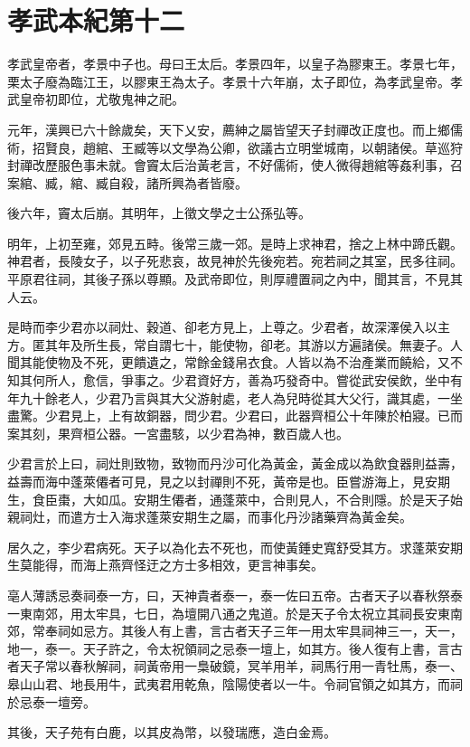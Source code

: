 \chapter{孝武本紀第十二}

孝武皇帝者，孝景中子也。母曰王太后。孝景四年，以皇子為膠東王。孝景七年，栗太子廢為臨江王，以膠東王為太子。孝景十六年崩，太子即位，為孝武皇帝。孝武皇帝初即位，尤敬鬼神之祀。

元年，漢興已六十餘歲矣，天下乂安，薦紳之屬皆望天子封禪改正度也。而上鄉儒術，招賢良，趙綰、王臧等以文學為公卿，欲議古立明堂城南，以朝諸侯。草巡狩封禪改歷服色事未就。會竇太后治黃老言，不好儒術，使人微得趙綰等姦利事，召案綰、臧，綰、臧自殺，諸所興為者皆廢。

後六年，竇太后崩。其明年，上徵文學之士公孫弘等。

明年，上初至雍，郊見五畤。後常三歲一郊。是時上求神君，捨之上林中蹄氏觀。神君者，長陵女子，以子死悲哀，故見神於先後宛若。宛若祠之其室，民多往祠。平原君往祠，其後子孫以尊顯。及武帝即位，則厚禮置祠之內中，聞其言，不見其人云。

是時而李少君亦以祠灶、穀道、卻老方見上，上尊之。少君者，故深澤侯入以主方。匿其年及所生長，常自謂七十，能使物，卻老。其游以方遍諸侯。無妻子。人聞其能使物及不死，更饋遺之，常餘金錢帛衣食。人皆以為不治產業而饒給，又不知其何所人，愈信，爭事之。少君資好方，善為巧發奇中。嘗從武安侯飲，坐中有年九十餘老人，少君乃言與其大父游射處，老人為兒時從其大父行，識其處，一坐盡驚。少君見上，上有故銅器，問少君。少君曰，此器齊桓公十年陳於柏寢。已而案其刻，果齊桓公器。一宮盡駭，以少君為神，數百歲人也。

少君言於上曰，祠灶則致物，致物而丹沙可化為黃金，黃金成以為飲食器則益壽，益壽而海中蓬萊僊者可見，見之以封禪則不死，黃帝是也。臣嘗游海上，見安期生，食臣棗，大如瓜。安期生僊者，通蓬萊中，合則見人，不合則隱。於是天子始親祠灶，而遣方士入海求蓬萊安期生之屬，而事化丹沙諸藥齊為黃金矣。

居久之，李少君病死。天子以為化去不死也，而使黃錘史寬舒受其方。求蓬萊安期生莫能得，而海上燕齊怪迂之方士多相效，更言神事矣。

亳人薄誘忌奏祠泰一方，曰，天神貴者泰一，泰一佐曰五帝。古者天子以春秋祭泰一東南郊，用太牢具，七日，為壇開八通之鬼道。於是天子令太祝立其祠長安東南郊，常奉祠如忌方。其後人有上書，言古者天子三年一用太牢具祠神三一，天一，地一，泰一。天子許之，令太祝領祠之忌泰一壇上，如其方。後人復有上書，言古者天子常以春秋解祠，祠黃帝用一梟破鏡，冥羊用羊，祠馬行用一青牡馬，泰一、皋山山君、地長用牛，武夷君用乾魚，陰陽使者以一牛。令祠官領之如其方，而祠於忌泰一壇旁。

其後，天子苑有白鹿，以其皮為幣，以發瑞應，造白金焉。

